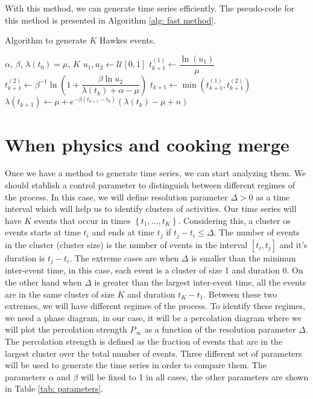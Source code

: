 With this method, we can generate time series efficiently. The pseudo-code for this method is presented in Algorithm \ref{alg: fast method}.
\begin{algorithm}
    \caption{Algorithm to generate $K$ Hawkes events.}\label{alg: fast method}
    \begin{algorithmic}
        \Require $\alpha$, $\beta$, $\lambda(t_0)=\mu$, $K$
            \State $u_1,u_2 \gets \mathcal{U}[0,1]$
            \State $t_{k+1}^{(1)}\gets \dfrac{\ln(u_1)}{\mu}$
            \State $t_{k+1}^{(2)} \gets \beta^{-1}\ln\left( 1+\dfrac{\beta\ln u_2}{\lambda(t_k)+\alpha-\mu} \right)$
            \State $t_{k+1} \gets \min\left( t_{k+1}^{(1)},t_{k+1}^{(2)} \right)$
            \State $\lambda(t_{k+1}) \gets \mu + e^{-\beta(t_{k+1}-t_k)}\left( \lambda(t_k)-\mu+n \right)$
        \EndFor
    \end{algorithmic}
\end{algorithm}


\section{When physics and cooking merge}\label{sec:physics_cooking}

Once we have a method to generate time series, we can start analyzing them. We should stablish a control parameter to distinguish between different regimes of the process. In this case,
we will define resolution parameter $\Delta >0$ as a time interval which will help us to identify clusters of activities. Our time series will have $K$ events that occur in times 
$\left\{ t_1,\ldots, t_K \right\}$. Considering this, a cluster os events starts at time $t_i$ and ends at time $t_j$ if $t_j-t_i\leq \Delta$. The number of events in the cluster (cluster 
size) is the number of events in the interval $[t_i,t_j]$ and it's duration is $t_j-t_i$. The extreme cases are when $\Delta$ is smaller than the minimun inter-event time, in this case,
each event is a cluster of size 1 and duration 0. On the other hand when $\Delta$ is greater than the largest inter-event time, all the events are in the same cluster of size $K$ and
duration $t_K-t_1$. Between these two extremes, we will have different regimes of the process. To identify these regimes, we need a phase diagram, in our case, it will be a percolation 
diagram where we will plot the percolation strength $P_{\infty}$ as a function of the resolution parameter $\Delta$. The percolation strength is defined as the fraction of events that are
in the largest cluster over the total number of events. Three different set of parameters will be used to generate the time series in order to compare them. The parameters $\alpha$ and 
$\beta$ will be fixed to 1 in all cases, the other parameters are shown in Table \ref{tab: parameters}.

